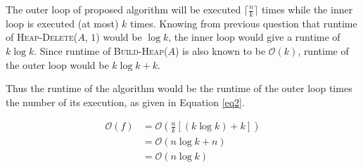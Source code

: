 The outer loop of proposed algorithm will be executed $\lceil \frac{n}{k} \rceil$ times while the inner loop is executed (at most) $k$ times.
Knowing from previous question that runtime of \textsc{Heap-Delete}($A$, $1$) would be $\log{k}$, the inner loop would give a runtime of $k\log{k}$.
Since runtime of \textsc{Build-Heap}($A$) is also known to be $\mathcal{O}(k)$, runtime of the outer loop would be $k \log k + k$.

Thus the runtime of the algorithm would be the runtime of the outer loop times the number of its execution, as given in Equation \ref{eq2}.

\begin{equation}\label{eq2}
\begin{aligned}
\mathcal{O}(f) &=
\mathcal{O}(\frac{n}{k}[(k\log k)+ k])\\ &= \mathcal{O}(n \log k + n)\\ &= \mathcal{O}(n\log k)
\end{aligned}
\end{equation}
